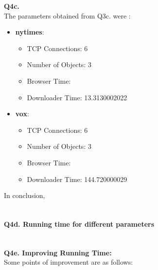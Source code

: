 \documentclass[12pt]{article}
\begin{document}
{\bfseries Q4c.} %
\\The parameters obtained from Q3c. were :
\begin{itemize}
\item \textbf{nytimes}: 
\begin{itemize}
	\item TCP Connections: 6
	\item Number of Objects: 3
	\item Browser Time:
	\item Downloader Time: 13.3130002022
\end{itemize}
\item \textbf{vox}:
\begin{itemize}
	\item TCP Connections: 6
	\item Number of Objects: 3
	\item Browser Time:
	\item Downloader Time: 144.720000029
\end{itemize}
\end{itemize}
In conclusion, 
\\\\\\
{\bfseries Q4d. Running time for different parameters}
\\\\\\
{\bfseries Q4e. Improving Running Time: }
\\ Some points of improvement are as follows:
\end{document}
